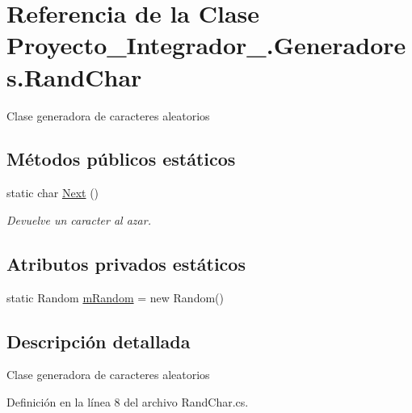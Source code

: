 \hypertarget{class_proyecto___integrador__3_1_1_generadores_1_1_rand_char}{\section{Referencia de la Clase Proyecto\-\_\-\-Integrador\-\_.\-Generadores.\-Rand\-Char}
\label{class_proyecto___integrador__3_1_1_generadores_1_1_rand_char}
}


Clase generadora de caracteres aleatorios  


\subsection*{Métodos públicos estáticos}
\begin{DoxyCompactItemize}
\item 
static char \hyperlink{class_proyecto___integrador__3_1_1_generadores_1_1_rand_char_a10b8b5e4415542c4edcfe5ffc3f93f31}{Next} ()
\begin{DoxyCompactList}\small\item\em Devuelve un caracter al azar. \end{DoxyCompactList}\end{DoxyCompactItemize}
\subsection*{Atributos privados estáticos}
\begin{DoxyCompactItemize}
\item 
static Random \hyperlink{class_proyecto___integrador__3_1_1_generadores_1_1_rand_char_adffe3586409f4c532130cf3559ac25d9}{m\-Random} = new Random()
\end{DoxyCompactItemize}


\subsection{Descripción detallada}
Clase generadora de caracteres aleatorios 



Definición en la línea 8 del archivo Rand\-Char.\-cs.




